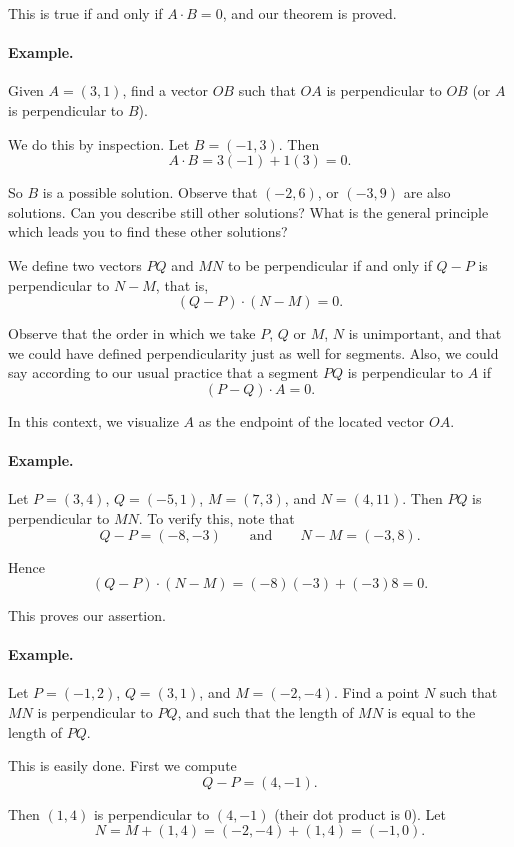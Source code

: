 \documentclass[12pt]{book} %
\begin{document}
\begin{ExerciseList}
This is true if and only if $A\cdot B=0$, and our theorem is proved.

\paragraph{Example.}
Given $A=(3,1)$, find a vector $OB$ such that $OA$ is perpendicular to $OB$ (or $A$ is perpendicular to $B$).

We do this by inspection. Let $B=(-1,3)$. Then
\[
A\cdot B=3(-1)+1(3)=0.
\]

So $B$ is a possible solution. Observe that $(-2,6)$, or $(-3,9)$ are also solutions. Can you describe still other solutions? What is the general principle which leads you to find these other solutions?

We define two vectors $PQ$ and $MN$ to be perpendicular if and only if $Q-P$ is perpendicular to $N-M$, that is,
\[
(Q-P)\cdot(N-M)=0.
\]


Observe that the order in which we take $P$, $Q$ or $M$, $N$ is unimportant, and that we could have defined perpendicularity just as well for segments. Also, we could say according to our usual practice that a segment $PQ$ is perpendicular to $A$ if
\[
(P-Q)\cdot A=0.
\]

In this context, we visualize $A$ as the endpoint of the located vector $OA$.

\paragraph{Example.}
Let $P=(3,4)$, $Q=(-5,1)$, $M=(7,3)$, and $N=(4,11)$. Then $PQ$ is perpendicular to $MN$. To verify this, note that
\[
Q-P=(-8,-3) \qquad \text{and} \qquad N-M=(-3,8).
\]

Hence
\[
(Q-P)\cdot(N-M)=(-8)(-3)+(-3)8=0.
\]

This proves our assertion.

\paragraph{Example.}
Let $P=(-1,2)$, $Q=(3,1)$, and $M=(-2,-4)$. Find a point $N$ such that $MN$ is perpendicular to $PQ$, and such that the length of $MN$ is equal to the length of $PQ$.

This is easily done. First we compute
\[
Q-P=(4,-1).
\]

Then $(1,4)$ is perpendicular to $(4,-1)$ (their dot product is 0). Let
\[
N=M+(1,4)=(-2,-4)+(1,4)=(-1,0).
\]


\end{ExerciseList}
\end{document}
